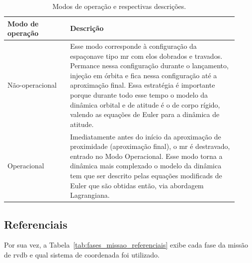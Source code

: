 \begin{table}[htbp]
\centering
\caption{Modos de operação e respectivas descrições.}
\label{tab:modos_operacao}
\begin{tabular}{p{0.25\linewidth} p{0.67\linewidth}}
\hline
\textbf{Modo de operação} & \textbf{Descrição} \\
\hline
Não-operacional &
Esse modo corresponde à configuração da espaçonave tipo \gls{mr} com elos dobrados e travados.
Permance nessa configuração durante o lançamento, injeção em órbita e fica nessa configuração até a aproximação final.
Essa estratégia é importante porque durante todo esse tempo o modelo da dinâmica orbital e de atitude  é o de corpo rígido, valendo as equações de Euler para a dinâmica de atitude.\\
\hline
Operacional &
Imediatamente antes do início da aproximação de proximidade (aproximação final), o \gls{mr} é destravado, entrado no Modo Operacional.
Esse modo torna a dinâmica mais complexado o modelo da dinâmica tem que ser descrito pelas equações modificads de Euler que são obtidas então, via abordagem Lagrangiana.\\
\hline
\end{tabular}
\end{table}


\subsection{Referenciais}

Por sua vez, a Tabela~\ref{tab:fases_missao_referenciais} exibe cada fase da missão de \gls{rvdb} e qual sistema de coordenada foi utilizado.

